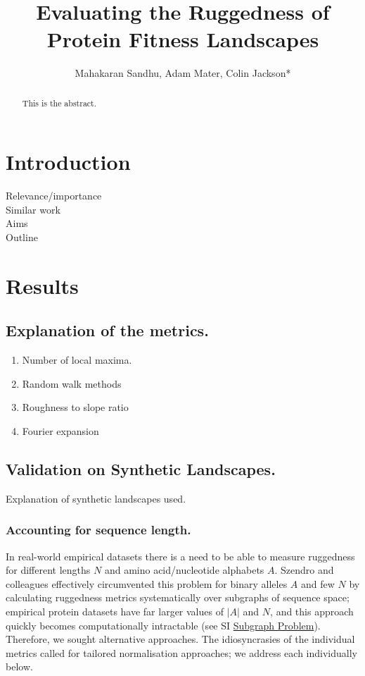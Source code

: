 \documentclass[10pt, reqno]{amsart}
\title{Evaluating the Ruggedness of Protein Fitness Landscapes}
\author{Mahakaran Sandhu, Adam Mater, Colin Jackson* }
\begin{document}
\maketitle

\begin{abstract}
    This is the abstract.
\end{abstract}



\section{Introduction}

Relevance/importance \\
Similar work \\
Aims \\
Outline\\

\clearpage
\section{Results}
\subsection{Explanation of the metrics.}
\begin{enumerate}
    \item Number of local maxima.
    \item Random walk methods
    \item Roughness to slope ratio
    \item Fourier expansion
\end{enumerate}


\subsection{Validation on Synthetic Landscapes.}

Explanation of synthetic landscapes used. 

\subsubsection{Accounting for sequence length.}

In real-world empirical datasets there is a need to be able to measure ruggedness for different lengths $N$ and amino acid/nucleotide alphabets $A$. Szendro and colleagues \supercite{Szendro2013} effectively circumvented this problem for binary alleles $A$ and few $N$ by calculating ruggedness metrics systematically over subgraphs of sequence space; empirical protein datasets have far larger values of $|A|$ and $N$, and this approach quickly becomes computationally intractable (see SI \hyperref[subgraph problem]{Subgraph Problem}). Therefore, we sought alternative approaches. The idiosyncrasies of the individual metrics called for tailored normalisation approaches; we address each individually below.\\
\end{document}
